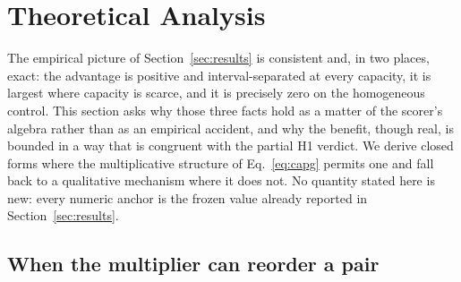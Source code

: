 \section{Theoretical Analysis}
\label{sec:theory}

The empirical picture of Section~\ref{sec:results} is consistent and, in two
places, exact: the advantage is positive and interval-separated at every
capacity, it is largest where capacity is scarce, and it is precisely zero on
the homogeneous control. This section asks why those three facts hold as a
matter of the scorer's algebra rather than as an empirical accident, and why the
benefit, though real, is bounded in a way that is congruent with the partial H1
verdict. We derive closed forms where the multiplicative structure of
Eq.~\ref{eq:capg} permits one and fall back to a qualitative mechanism where it
does not. No quantity stated here is new: every numeric anchor is the frozen
value already reported in Section~\ref{sec:results}.

\subsection{When the multiplier can reorder a pair}
\label{sec:theory_reorder}

